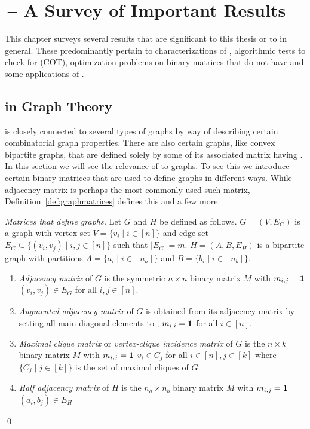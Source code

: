 \chapter{\CoP\,-- A Survey of Important Results}
\label{ch:copsurvey}

This chapter surveys several results that are significant to this
thesis or to \COP in general. These predominantly pertain to
characterizations of \COP, algorithmic tests to check for \COP (COT),
optimization problems on binary matrices that do not have \COP and
some applications of \COP.



\section{\COP in Graph Theory}

\COP is closely connected to several types of graphs by way of
describing certain combinatorial graph properties. There are also
certain graphs, like convex bipartite graphs, that are defined solely
by some of its associated matrix having \COP.  In this section we will
see the relevance of \cop to graphs.  To see this we introduce certain
binary matrices that are used to define graphs in different
ways. While adjacency matrix is perhaps the most commonly used such
matrix, Definition~\ref{def:graphmatrices} defines this and a few
more.

\begin{definition}{\emph{Matrices that define
      graphs.\cite[Def.~2.4]{d08phd}}} %
  \label{def:graphmatrices} %
  Let $G$ and $H$ be defined as follows. $G = (V,E_G)$ is a graph with
  vertex set $V = \{v_i \mid i \in [n]\}$ and edge set $E_G \subseteq
  \{(v_i,v_j) \mid i, j \in [n]\}$ such that $|E_G| = m$. $H = (A, B,
  E_H)$ is a bipartite graph with partitions $A = \{a_i \mid i \in
  [n_a]\}$ and $B = \{b_i \mid i \in [n_b]\}$.
  \begin{enumerate}
  \item \emph{Adjacency matrix} of $G$ is the symmetric $n \times n$
    binary matrix $M$ with $m_{i,j} = \textbf{1}$ \iff $(v_i,v_j) \in E_G$
    for all $i,j \in [n]$.
  \item \emph{Augmented adjacency matrix} of $G$ is obtained from its
    adjacency matrix by setting all main diagonal elements to \un, \ie
    $m_{i,i} = \textbf{1}$ for all $i \in [n]$.
  \item \emph{Maximal clique matrix} or \emph{vertex-clique incidence
      matrix} of $G$ is the $n \times k$ binary matrix $M$ with
    $m_{i,j} = \textbf{1}$ \iff $v_i \in C_j$ for all $i \in [n], j \in [k]$
    where $\{C_j \mid j \in [k]\}$ is the set of maximal cliques of
    $G$.
  \item \emph{Half adjacency matrix} of $H$ is the $n_a \times n_b$
    binary matrix $M$ with $m_{i,j} = \textbf{1}$ \iff $(a_i, b_j) \in E_H$
  \end{enumerate}
\end{definition}
\qed

